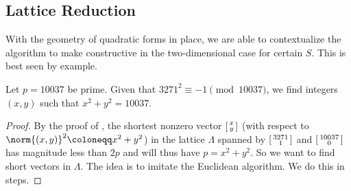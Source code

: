 \documentclass[../notes.tex]{subfiles}
\begin{document}
\subsection{Lattice Reduction} \label{subsec:lattice-reduction}
With the geometry of quadratic forms in place, we are able to contextualize the algorithm to make  constructive in the two-dimensional case for certain $S$. This is best seen by example.
\begin{example}
	Let $p=10037$ be prime. Given that $3271^2\equiv-1\pmod{10037}$, we find integers $(x,y)$ such that $x^2+y^2=10037$.
\end{example}
\begin{proof}
	By the proof of , the shortest nonzero vector $\begin{bsmallmatrix}
		x \\ y
	\end{bsmallmatrix}$ (with respect to $\norm{(x,y)}^2\coloneqq x^2+y^2$) in the lattice $\Lambda$ spanned by $\begin{bsmallmatrix}
		3271 \\ 1
	\end{bsmallmatrix}$ and $\begin{bsmallmatrix}
		10037 \\ 0
	\end{bsmallmatrix}$ has magnitude less than $2p$ and will thus have $p=x^2+y^2$. So we want to find short vectors in $\Lambda$. The idea is to imitate the Euclidean algorithm. We do this in steps.
\end{proof}
\end{document}
